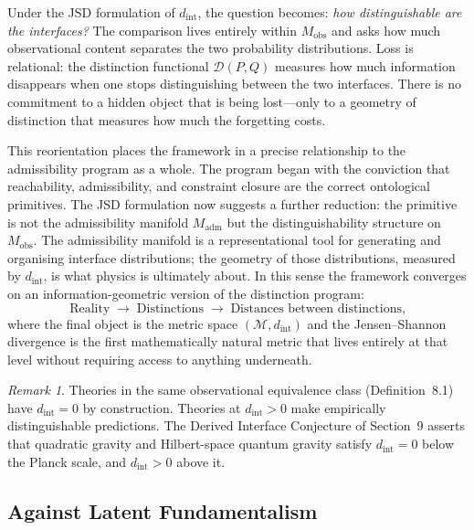 \documentclass[12pt,a4paper]{article}
\theoremstyle{remark}
\newtheorem{remark}{Remark}[section]
\begin{document}
Under the JSD formulation of $d_{\mathrm{int}}$, the question becomes:
\emph{how distinguishable are the interfaces?} The comparison lives entirely
within $M_{\mathrm{obs}}$ and asks how much observational content separates
the two probability distributions. Loss is relational: the distinction
functional $\mathcal{D}(P,Q)$ measures how much information disappears when
one stops distinguishing between the two interfaces. There is no commitment
to a hidden object that is being lost---only to a geometry of distinction
that measures how much the forgetting costs.

This reorientation places the framework in a precise relationship to the
admissibility program as a whole. The program began with the conviction
that reachability, admissibility, and constraint closure are the correct
ontological primitives. The JSD formulation now suggests a further
reduction: the primitive is not the admissibility manifold $M_{\mathrm{adm}}$
but the distinguishability structure on $M_{\mathrm{obs}}$. The admissibility
manifold is a representational tool for generating and organising interface
distributions; the geometry of those distributions, measured by
$d_{\mathrm{int}}$, is what physics is ultimately about. In this sense the
framework converges on an information-geometric version of the distinction
program:
\begin{equation}
  \text{Reality}
  \;\longrightarrow\;
  \text{Distinctions}
  \;\longrightarrow\;
  \text{Distances between distinctions,}
\end{equation}
where the final object is the metric space $(\mathcal{M}, d_{\mathrm{int}})$
and the Jensen--Shannon divergence is the first mathematically natural
metric that lives entirely at that level without requiring access to
anything underneath.

\begin{remark}
Theories in the same observational equivalence class (Definition~8.1) have
$d_{\mathrm{int}} = 0$ by construction. Theories at $d_{\mathrm{int}} > 0$
make empirically distinguishable predictions. The Derived Interface
Conjecture of Section~9 asserts that quadratic gravity and Hilbert-space
quantum gravity satisfy $d_{\mathrm{int}} = 0$ below the Planck scale, and
$d_{\mathrm{int}} > 0$ above it.
\end{remark}

\subsection{Against Latent Fundamentalism}
\end{document}
